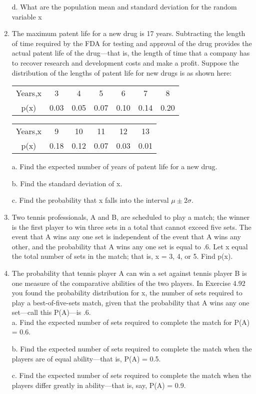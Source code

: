 \documentclass{article}
\begin{document}
\begin{enumerate}
d. What are the population mean and standard deviation for the random variable x
\item The maximum patent life for a new drug is 17 years. Subtracting the length of time required by the FDA for testing and approval of the drug provides the actual patent life of the drug—that is, the length of time that a company has to recover research and development costs and make a profit. Suppose the distribution of the lengths of patent life for new drugs is as shown here: \\
\begin{center}
    \begin{tabular}{|c|c|c|c|c|c|c|}
        \hline
        Years,x & 3 & 4 & 5 & 6 & 7 & 8\\
        p(x) & 0.03 & 0.05 & 0.07 & 0.10 & 0.14 & 0.20 \\
        \hline
    \end{tabular}
\end{center}
\begin{center}
    \begin{tabular}{|c|c|c|c|c|c|}
        \hline
        Years,x & 9 & 10 & 11 & 12 & 13 \\
        p(x) & 0.18 & 0.12 & 0.07 & 0.03 & 0.01 \\
        \hline
    \end{tabular}
\end{center}
a. Find the expected number of years of patent life for a new drug.

b. Find the standard deviation of x.

c. Find the probability that x falls into the interval $\mu \pm 2\sigma$.

\item Two tennis professionals, A and B, are scheduled to play a match; the winner is the first player to win three sets in a total that cannot exceed five sets. The event that A wins any one set is independent of the event that A wins any other, and the probability that A wins any one set is equal to .6. Let x equal the total number of sets in the match; that is, x = 3, 4, or 5. Find p(x). 

\item The probability that tennis player A can win a set against tennis player B is one measure of the comparative abilities of the two players. In Exercise 4.92 you found the probability distribution for x, the number of sets required to play a best-of-five-sets match, given that the probability that A wins any one set—call this P(A)—is .6. \\
a. Find the expected number of sets required to complete the match for P(A) = 0.6.

b. Find the expected number of sets required to complete the match when the players are of equal ability—that is, P(A) = 0.5.

c. Find the expected number of sets required to complete the match when the players differ greatly in ability—that is, say, P(A) = 0.9.
\end{enumerate}
\end{document}
